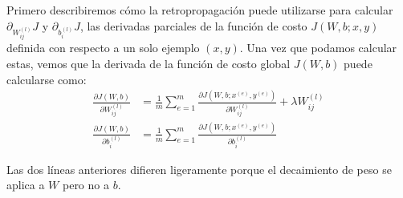 Primero describiremos cómo la retropropagación puede utilizarse para calcular $\partial_{W^{(l)}_{ij}}J$ y $\partial_{b^{(l)}_{i}}J$, las derivadas parciales de la función de costo $J(W,b;x,y)$ definida con respecto a un solo ejemplo $(x, y)$. Una vez que podamos calcular estas, vemos que la derivada de la función de costo global $J(W,b)$ puede calcularse como:
\begin{align}
\frac{\partial J(W,b)}{\partial W^{(l)}_{ij}} &= \frac{1}{m} \sum_{e = 1}^m \frac{\partial J(W,b;x^{(e)},y^{(e)})}{\partial W^{(l)}_{ij}} + \lambda W^{(l)}_{ij} \\
\frac{\partial J(W,b)}{\partial b^{(l)}_i} &= \frac{1}{m} \sum_{e = 1}^m \frac{\partial J(W,b;x^{(e)},y^{(e)})}{\partial b^{(l)}_i}
\end{align}

Las dos líneas anteriores difieren ligeramente porque el decaimiento de peso se aplica a $W$ pero no a $b$. \\

